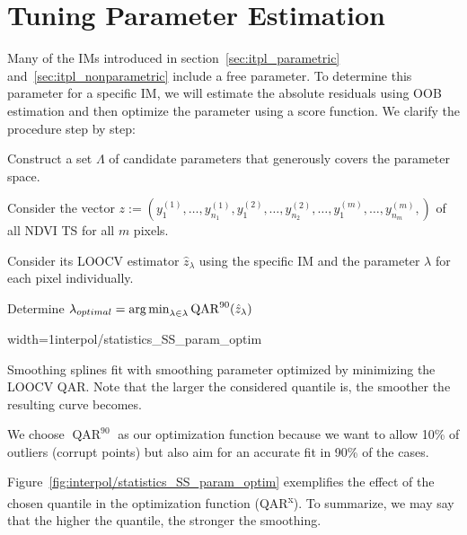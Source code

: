 \section{Tuning Parameter Estimation}{ \label{sec:itpl_param_est}
	Many of the {{IM}}s introduced in section~\ref{sec:itpl_parametric} and~\ref{sec:itpl_nonparametric} include a free parameter. To determine this parameter for a specific {{IM}}, we will estimate the absolute residuals using OOB estimation and then optimize the parameter using a score function. We clarify the procedure step by step:	
	\begin{Nenumerate}
		\item Construct a set $\Lambda$ of candidate parameters that generously covers the parameter space.
		\item Consider the vector $z:=(y_1^{(1)},\dots,y_{n_1}^{(1)},y_1^{(2)},\dots,y_{n_2}^{(2)},\dots,y_1^{(m)},\dots,y_{n_m}^{(m)},)$ of all NDVI TS for all $m$ pixels.
		\item Consider its LOOCV estimator $\hat z_\lambda$ using the specific IM and the parameter $\lambda$ for each pixel individually.
		\item Determine $\lambda_{optimal} = \operatorname*{arg\, min}_{\lambda\in\lambda}\operatorname{QAR}^{90}(\hat z_\lambda)$
	\end{Nenumerate}

	\begin{my_figure}[h]{width=1\textwidth}{interpol/statistics_SS_param_optim}
		\caption[Smoothing splines optimized by minimizing the given quantile of the absolute leave-one-out residuals]{Smoothing splines fit with smoothing parameter optimized by minimizing the LOOCV QAR. Note that the larger the considered quantile is, the smoother the resulting curve becomes.}
		\label{fig:interpol/statistics_SS_param_optim}
	\end{my_figure}

	We choose $\operatorname{QAR}^{90}$ as our optimization function because we want to allow 10\% of outliers (corrupt points) but also aim for an accurate fit in 90\% of the cases.  
	
	Figure~\ref{fig:interpol/statistics_SS_param_optim} exemplifies the effect of the chosen quantile in the optimization function (QAR\textsuperscript{x}). To summarize, we may say that the higher the quantile, the stronger the smoothing. 
}


